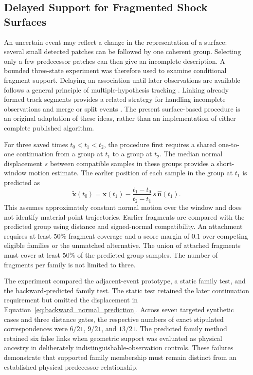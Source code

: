 \subsection{Delayed Support for Fragmented Shock Surfaces}
\label{subsec:delayed_fragment_support}

An uncertain event may reflect a change in the representation of a surface:
several small detected patches can be followed by one coherent group.
Selecting only a few predecessor patches can then give an incomplete
description. A bounded three-state experiment was therefore used to examine
conditional fragment support. Delaying an association until later observations
are available follows a general principle of multiple-hypothesis tracking
\cite{Reid1979}. Linking already formed track segments provides a related
strategy for handling incomplete observations and merge or split events
\cite{Jaqaman2008}. The present surface-based procedure is an original
adaptation of these ideas, rather than an implementation of either complete
published algorithm.

For three saved times $t_0<t_1<t_2$, the procedure first requires a shared
one-to-one continuation from a group at $t_1$ to a group at $t_2$.
The median normal displacement $s$ between compatible samples in these
groups provides a short-window motion estimate. The earlier position of
each sample in the group at $t_1$ is predicted as
\begin{equation}
    \widetilde{\boldsymbol{x}}(t_0)
    =
    \boldsymbol{x}(t_1)
    - \frac{t_1-t_0}{t_2-t_1}\,s\,\hat{\boldsymbol{n}}(t_1).
    \label{eq:backward_normal_prediction}
\end{equation}
This assumes approximately constant normal motion over the window and
does not identify material-point trajectories. Earlier fragments are compared
with the predicted group using distance and signed-normal compatibility.
An attachment requires at least $50\%$ fragment coverage and a score margin
of $0.1$ over competing eligible families or the unmatched alternative.
The union of attached fragments must cover at least $50\%$ of the predicted
group samples. The number of fragments per family is not limited to three.

The experiment compared the adjacent-event prototype, a static family test,
and the backward-predicted family test. The static test retained the later
continuation requirement but omitted the displacement in
Equation~\ref{eq:backward_normal_prediction}. Across seven targeted synthetic
cases and three distance gates, the respective numbers of exact stipulated
correspondences were $6/21$, $9/21$, and $13/21$. The predicted family method
retained six false links when geometric support was evaluated as physical
ancestry in deliberately indistinguishable-observation controls. These
failures demonstrate that supported family membership must remain distinct
from an established physical predecessor relationship.

